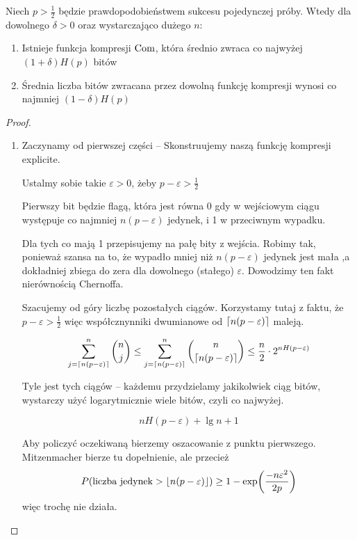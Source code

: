 \begin{theorem}
	Niech \( p > \frac{1}{2} \) będzie prawdopodobieństwem sukcesu pojedynczej próby.
	Wtedy dla dowolnego \( \delta > 0 \) oraz wystarczająco dużego \( n \):
	\begin{enumerate}
		\item Istnieje funkcja kompresji \( \operatorname{Com} \), która średnio zwraca co najwyżej \( (1 + \delta)H(p) \) bitów
		\item Średnia liczba bitów zwracana przez dowolną funkcję kompresji wynosi co najmniej \( (1-\delta)H(p) \)
	\end{enumerate}
\end{theorem}
\begin{proof} \( \)
	\begin{enumerate}
		\item Zaczynamy od pierwszej części -- Skonstruujemy naszą funkcję kompresji explicite.

		      Ustalmy sobie takie \( \varepsilon > 0 \), żeby \( p - \varepsilon > \frac{1}{2} \)

		      Pierwszy bit będzie flagą, która jest równa 0 gdy w wejściowym ciągu występuje co najmniej \( n(p - \varepsilon) \) jedynek, i 1 w przeciwnym wypadku.

		      Dla tych co mają 1 przepisujemy na pałę bity z wejścia. Robimy tak, ponieważ szansa na to, że wypadło mniej niż \( n(p - \varepsilon) \) jedynek jest mała ,a dokładniej zbiega do zera dla dowolnego (stałego) \( \varepsilon \).
		      Dowodzimy ten fakt nierównością Chernoffa.

		      Szacujemy od góry liczbę pozostałych ciągów. Korzystamy tutaj z faktu, że \( p - \varepsilon > \frac{1}{2} \) więc współcznynniki dwumianowe od \( \left\lceil n(p - \varepsilon)\right\rceil \) maleją.

		      \[
			      \sum_{j=\left\lceil n(p - \varepsilon)\right\rceil}^n \binom{n}{j} \leq
			      \sum_{j=\left\lceil n(p - \varepsilon)\right\rceil}^n \binom{n}{\left\lceil n(p - \varepsilon)\right\rceil}
			      \leq \frac{n}{2} \cdot 2^{nH(p - \varepsilon)}
		      \]

		      Tyle jest tych ciągów -- każdemu przydzielamy jakikolwiek ciąg bitów, wystarczy użyć logarytmicznie wiele bitów, czyli co najwyżej.

		      \[
			      nH(p - \varepsilon) + \lg n + 1
		      \]

		      Aby policzyć oczekiwaną bierzemy oszacowanie z punktu pierwszego.
		      Mitzenmacher bierze tu dopełnienie, ale przecież
		      \[
			      P(\text{liczba jedynek} > \floor{n(p - \varepsilon)}) \geq 1 - \exp\pars{\frac{-n\varepsilon^2}{2p}}
		      \]
		      więc trochę nie działa.


\end{enumerate}
\end{proof}
